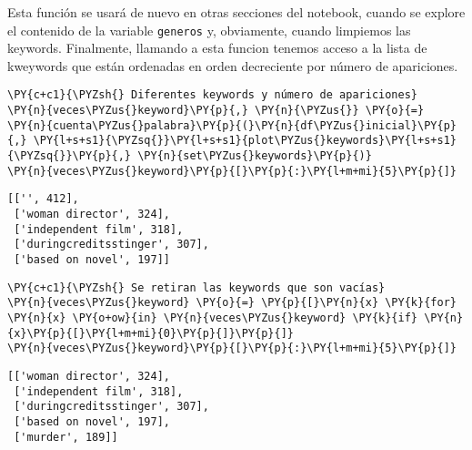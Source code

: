     Esta función se usará de nuevo en otras secciones del notebook, cuando
se explore el contenido de la variable \texttt{generos} y, obviamente,
cuando limpiemos las keywords. Finalmente, llamando a esta funcion
tenemos acceso a la lista de kweywords que están ordenadas en orden
decreciente por número de apariciones.

    \begin{tcolorbox}[breakable, size=fbox, boxrule=1pt, pad at break*=1mm,colback=cellbackground, colframe=cellborder]
\begin{Verbatim}[commandchars=\\\{\}]
\PY{c+c1}{\PYZsh{} Diferentes keywords y número de apariciones}
\PY{n}{veces\PYZus{}keyword}\PY{p}{,} \PY{n}{\PYZus{}} \PY{o}{=} \PY{n}{cuenta\PYZus{}palabra}\PY{p}{(}\PY{n}{df\PYZus{}inicial}\PY{p}{,} \PY{l+s+s1}{\PYZsq{}}\PY{l+s+s1}{plot\PYZus{}keywords}\PY{l+s+s1}{\PYZsq{}}\PY{p}{,} \PY{n}{set\PYZus{}keywords}\PY{p}{)}
\PY{n}{veces\PYZus{}keyword}\PY{p}{[}\PY{p}{:}\PY{l+m+mi}{5}\PY{p}{]}
\end{Verbatim}
\end{tcolorbox}

            \begin{tcolorbox}[breakable, size=fbox, boxrule=.5pt, pad at break*=1mm, opacityfill=0]
\begin{Verbatim}[commandchars=\\\{\}]
[['', 412],
 ['woman director', 324],
 ['independent film', 318],
 ['duringcreditsstinger', 307],
 ['based on novel', 197]]
\end{Verbatim}
\end{tcolorbox}
        
    \begin{tcolorbox}[breakable, size=fbox, boxrule=1pt, pad at break*=1mm,colback=cellbackground, colframe=cellborder]
\begin{Verbatim}[commandchars=\\\{\}]
\PY{c+c1}{\PYZsh{} Se retiran las keywords que son vacías}
\PY{n}{veces\PYZus{}keyword} \PY{o}{=} \PY{p}{[}\PY{n}{x} \PY{k}{for} \PY{n}{x} \PY{o+ow}{in} \PY{n}{veces\PYZus{}keyword} \PY{k}{if} \PY{n}{x}\PY{p}{[}\PY{l+m+mi}{0}\PY{p}{]}\PY{p}{]}
\PY{n}{veces\PYZus{}keyword}\PY{p}{[}\PY{p}{:}\PY{l+m+mi}{5}\PY{p}{]}
\end{Verbatim}
\end{tcolorbox}

            \begin{tcolorbox}[breakable, size=fbox, boxrule=.5pt, pad at break*=1mm, opacityfill=0]
\begin{Verbatim}[commandchars=\\\{\}]
[['woman director', 324],
 ['independent film', 318],
 ['duringcreditsstinger', 307],
 ['based on novel', 197],
 ['murder', 189]]
\end{Verbatim}
\end{tcolorbox}
        
